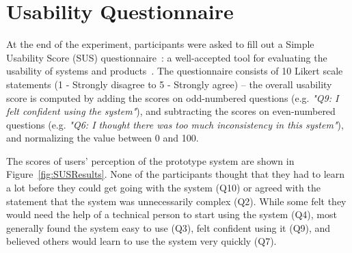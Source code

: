 \documentclass[sigconf, anonymous, balance=false]{acmart}
\newcommand{\myparagraph}[1]{\myparagraphnodot{#1.}}
\newcommand{\myparagraphnodot}[1]{\vspace{4pt} \noindent {\bfseries #1}\xspace}
\begin{document}



\section{Usability Questionnaire}
At the end of the experiment, participants were asked to fill out a Simple Usability Score (SUS) questionnaire~\cite{SUS}: a well-accepted tool for evaluating the usability of systems and products~\cite{interpretingSUS}.
The questionnaire consists of 10 Likert scale statements (1 - Strongly disagree to 5 - Strongly agree) -- the overall usability score is computed by adding the scores on odd-numbered questions (e.g. \emph{"Q9: I felt confident using the system"}), and subtracting the scores on even-numbered questions (e.g. \emph{"Q6: I thought there was too much inconsistency in this system"}), and normalizing the value between 0 and 100.

\myparagraph{Results}
The scores of users' perception of the prototype system are shown in Figure~\ref{fig:SUSResults}.
None of the participants thought that they had to learn a lot before they could get going with the system (Q10) or agreed with the statement that the system was unnecessarily complex (Q2).
While some felt they would need the help of a technical person to start using the system (Q4), most generally found the system easy to use (Q3), felt confident using it (Q9), and believed others would learn to use the system very quickly (Q7).
\end{document}
